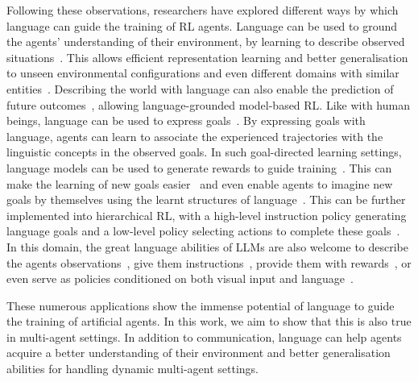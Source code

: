 Following these observations, researchers have explored different ways by which language can guide the training of RL agents. Language can be used to ground the agents' understanding of their environment, by learning to describe observed situations~\citep{Ruis2020_gSCAN, Hanjie2021_EMMA, Hill2021_Grounded}. This allows efficient representation learning and better generalisation to unseen environmental configurations and even different domains with similar entities~\citep{Narasimhan2018_Transfer}.
Describing the world with language can also enable the prediction of future outcomes~\citep{Huang2022_InnerMonol, Lin2023_Dynalang, Nottingham2023_DECKARD}, allowing language-grounded model-based RL. 
Like with human beings, language can be used to express goals~\citep{Lynch2021_MCIL}. By expressing goals with language, agents can learn to associate the experienced trajectories with the linguistic concepts in the observed goals. In such goal-directed learning settings, language models can be used to generate rewards to guide training~\citep{Carta2022_EAGER}. This can make the learning of new goals easier~\citep{CoReyes2018_GPL, Shridhar2021_CLIPort, Li2022_LID} and even enable agents to imagine new goals by themselves using the learnt structures of language~\citep{Colas2020_Imagine, Akakzia2021_DECSTR, Colas2022_Autotelic}. This can be further implemented into hierarchical RL, with a high-level instruction policy generating language goals and a low-level policy selecting actions to complete these goals~\citep{Hu2019_HierarLang, Jiang2019_CLEVR, Weir2023_HLLP}. 
In this domain, the great language abilities of LLMs are also welcome to describe the agents observations~\citep{Huang2022_InnerMonol, Zhu2024_CognitiveLLMs}, give them instructions~\citep{Ahn2022_SayCan, Huang2022_InnerMonol, Carta2023_GLAM, Huang2023_GroundDec}, provide them with rewards~\citep{Baumli2023_VLRewards}, or even serve as policies conditioned on both visual input and language~\citep{Reed2022_Gato, Brohan2023_RT2, Driess2023_PaLME}.

These numerous applications show the immense potential of language to guide the training of artificial agents. In this work, we aim to show that this is also true in multi-agent settings. In addition to communication, language can help agents acquire a better understanding of their environment and better generalisation abilities for handling dynamic multi-agent settings. 



